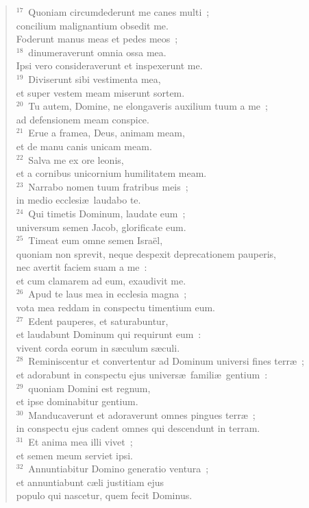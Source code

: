 \begin{verse}
${}^{17}$~Quoniam circumdederunt me canes multi~;\\ concilium malignantium obsedit me.\\ Foderunt manus meas et pedes meos~;\\
${}^{18}$~dinumeraverunt omnia ossa mea.\\ Ipsi vero consideraverunt et inspexerunt me.\\
${}^{19}$~Diviserunt sibi vestimenta mea,\\ et super vestem meam miserunt sortem.\\
${}^{20}$~Tu autem, Domine, ne elongaveris auxilium tuum a me~;\\ ad defensionem meam conspice.\\
${}^{21}$~Erue a framea, Deus, animam meam,\\ et de manu canis unicam meam.\\
${}^{22}$~Salva me ex ore leonis,\\ et a cornibus unicornium humilitatem meam.\\
${}^{23}$~Narrabo nomen tuum fratribus meis~;\\ in medio ecclesi\ae\ laudabo te.\\
${}^{24}$~Qui timetis Dominum, laudate eum~;\\ universum semen Jacob, glorificate eum.\\
${}^{25}$~Timeat eum omne semen Isra\"el,\\ quoniam non sprevit, neque despexit deprecationem pauperis,\\ nec avertit faciem suam a me~:\\ et cum clamarem ad eum, exaudivit me.\\
${}^{26}$~Apud te laus mea in ecclesia magna~;\\ vota mea reddam in conspectu timentium eum.\\
${}^{27}$~Edent pauperes, et saturabuntur,\\ et laudabunt Dominum qui requirunt eum~:\\ vivent corda eorum in s\ae culum s\ae culi.\\
${}^{28}$~Reminiscentur et convertentur ad Dominum universi fines terr\ae~;\\ et adorabunt in conspectu ejus univers\ae\ famili\ae\ gentium~:\\
${}^{29}$~quoniam Domini est regnum,\\ et ipse dominabitur gentium.\\
${}^{30}$~Manducaverunt et adoraverunt omnes pingues terr\ae~;\\ in conspectu ejus cadent omnes qui descendunt in terram.\\
${}^{31}$~Et anima mea illi vivet~;\\ et semen meum serviet ipsi.\\
${}^{32}$~Annuntiabitur Domino generatio ventura~;\\ et annuntiabunt c\ae li justitiam ejus\\ populo qui nascetur, quem fecit Dominus.\end{verse}



